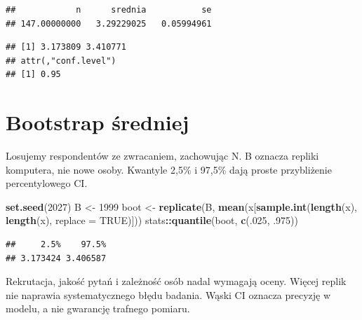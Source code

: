 \documentclass[
  polish,
  11pt,
  a4paper,
]{article}
\newenvironment{Shaded}{\begin{snugshade}}{\end{snugshade}}
\newcommand{\AttributeTok}[1]{\textcolor[rgb]{0.13,0.29,0.53}{#1}}
\newcommand{\ConstantTok}[1]{\textcolor[rgb]{0.56,0.35,0.01}{#1}}
\newcommand{\DecValTok}[1]{\textcolor[rgb]{0.00,0.00,0.81}{#1}}
\newcommand{\FunctionTok}[1]{\textcolor[rgb]{0.13,0.29,0.53}{\textbf{#1}}}
\newcommand{\NormalTok}[1]{#1}
\newcommand{\OtherTok}[1]{\textcolor[rgb]{0.56,0.35,0.01}{#1}}
\newcommand{\SpecialCharTok}[1]{\textcolor[rgb]{0.81,0.36,0.00}{\textbf{#1}}}
\begin{document}
\begin{verbatim}
##            n      srednia           se
## 147.00000000   3.29229025   0.05994961
\end{verbatim}

\begin{Shaded}
\end{Shaded}

\begin{verbatim}
## [1] 3.173809 3.410771
## attr(,"conf.level")
## [1] 0.95
\end{verbatim}

\section{Bootstrap średniej}\label{bootstrap-ux15bredniej}

Losujemy respondentów ze zwracaniem, zachowując N. B oznacza repliki
komputera, nie nowe osoby. Kwantyle 2,5\% i 97,5\% dają proste
przybliżenie percentylowego CI.

\begin{Shaded}
\begin{Highlighting}[]
\FunctionTok{set.seed}\NormalTok{(}\DecValTok{2027}\NormalTok{)}
\NormalTok{B }\OtherTok{\textless{}{-}} \DecValTok{1999}
\NormalTok{boot }\OtherTok{\textless{}{-}} \FunctionTok{replicate}\NormalTok{(B, }\FunctionTok{mean}\NormalTok{(x[}\FunctionTok{sample.int}\NormalTok{(}\FunctionTok{length}\NormalTok{(x), }\FunctionTok{length}\NormalTok{(x), }\AttributeTok{replace =} \ConstantTok{TRUE}\NormalTok{)]))}
\NormalTok{stats}\SpecialCharTok{::}\FunctionTok{quantile}\NormalTok{(boot, }\FunctionTok{c}\NormalTok{(.}\DecValTok{025}\NormalTok{, .}\DecValTok{975}\NormalTok{))}
\end{Highlighting}
\end{Shaded}

\begin{verbatim}
##     2.5%    97.5%
## 3.173424 3.406587
\end{verbatim}

Rekrutacja, jakość pytań i zależność osób nadal wymagają oceny. Więcej
replik nie naprawia systematycznego błędu badania. Wąski CI oznacza
precyzję w modelu, a nie gwarancję trafnego pomiaru.
\end{document}
